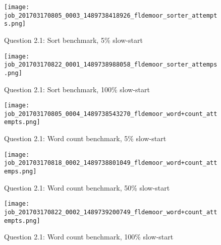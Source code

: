 
\begin{figure}[!ht]
    \centering
    \texttt{[image: job\_201703170805\_0003\_1489738418926\_fldemoor\_sorter\_attempts.png]}
    \caption{Question 2.1: Sort benchmark, 5\% slow-start}
    \label{2.1.sort.5}
\end{figure}
\newpage

\begin{figure}[!ht]
    \centering
    \texttt{[image: job\_201703170822\_0001\_1489738988058\_fldemoor\_sorter\_attemps.png]}
    \caption{Question 2.1: Sort benchmark, 100\% slow-start}
    \label{2.1.sort.100}
\end{figure}
\newpage

\begin{figure}[!ht]
    \centering
    \texttt{[image: job\_201703170805\_0004\_1489738543270\_fldemoor\_word+count\_attempts.png]}
    \caption{Question 2.1: Word count benchmark, 5\% slow-start}
    \label{2.1.wc.5}
\end{figure}
\newpage

\begin{figure}[!ht]
    \centering
    \texttt{[image: job\_201703170818\_0002\_1489738801049\_fldemoor\_word+count\_attemps.png]}
    \caption{Question 2.1: Word count benchmark, 50\% slow-start}
    \label{2.1.wc.50}
\end{figure}
\newpage

\begin{figure}[!ht]
    \centering
    \texttt{[image: job\_201703170822\_0002\_1489739200749\_fldemoor\_word+count\_attempts.png]}
    \caption{Question 2.1: Word count benchmark, 100\% slow-start}
    \label{2.1.wc.100}
\end{figure}
\newpage
